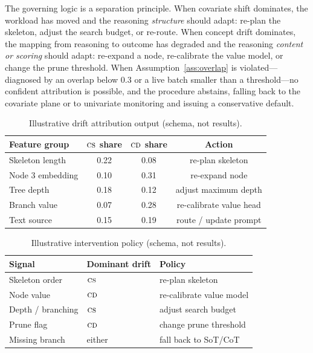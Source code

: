 \documentclass[11pt]{article}
\newcommand{\CS}{\textsc{cs}}
\newcommand{\CD}{\textsc{cd}}
\begin{document}
The governing logic is a separation principle. When covariate shift dominates,
the workload has moved and the reasoning \emph{structure} should adapt: re-plan
the skeleton, adjust the search budget, or re-route. When concept drift
dominates, the mapping from reasoning to outcome has degraded and the reasoning
\emph{content or scoring} should adapt: re-expand a node, re-calibrate the value
model, or change the prune threshold. When Assumption~\ref{ass:overlap} is
violated---diagnosed by an overlap below $0.3$ or a live batch smaller than a
threshold---no confident attribution is possible, and the procedure abstains,
falling back to the covariate plane or to univariate monitoring and issuing a
conservative default.

\begin{table}[t]
\centering
\caption{Illustrative drift attribution output (schema, not results).}
\label{tab:drift}
\small
\begin{tabular}{lccc}
\toprule
Feature group & $\CS$ share & $\CD$ share & Action \\
\midrule
Skeleton length & 0.22 & 0.08 & re-plan skeleton \\
Node 3 embedding & 0.10 & 0.31 & re-expand node \\
Tree depth & 0.18 & 0.12 & adjust maximum depth \\
Branch value & 0.07 & 0.28 & re-calibrate value head \\
Text source & 0.15 & 0.19 & route / update prompt \\
\bottomrule
\end{tabular}
\end{table}

\begin{table}[t]
\centering
\caption{Illustrative intervention policy (schema, not results).}
\label{tab:policy}
\small
\begin{tabular}{lll}
\toprule
Signal & Dominant drift & Policy \\
\midrule
Skeleton order & $\CS$ & re-plan skeleton \\
Node value & $\CD$ & re-calibrate value model \\
Depth / branching & $\CS$ & adjust search budget \\
Prune flag & $\CD$ & change prune threshold \\
Missing branch & either & fall back to SoT/CoT \\
\bottomrule
\end{tabular}
\end{table}
\end{document}
